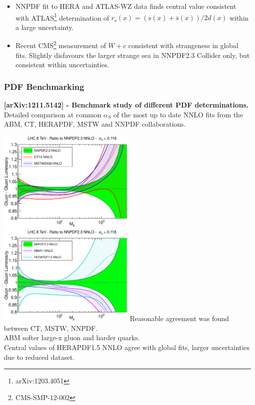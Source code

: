 \documentclass[10pt]{beamer}
\begin{document}
\begin{frame}
\begin{columns}
\begin{column}{0.5\textwidth}
   \end{column}
  \end{columns}
            \vskip10pt
  {\small
  \begin{itemize}
\item<1->NNPDF fit to HERA and ATLAS-WZ data finds central
value consistent with ATLAS\footnote{arXiv:1203.4051} determination of $r_s(x) = (s(x) + \bar{s}(x)) / 2d(x)$ within a large uncertainty.
\item<1->Recent CMS\footnote{CMS-SMP-12-002} measurement of $W+c$ consistent with strangeness in global fits.
Slightly disfavours the larger strange sea in NNPDF2.3 Collider only, but consistent within uncertainties.
\end{itemize}

}


\end{frame}


\begin{frame}
\frametitle{PDF Benchmarking}
\textbf{[arXiv:1211.5142] -
Benchmark study of different PDF determinations.}\\
\small{Detailed comparison at common $\alpha_S$ of the most up to date NNLO fits from the ABM, CT, HERAPDF, MSTW and NNPDF collaborations.}

\vskip10pt
     \includegraphics[width=0.5\textwidth]{gg_8tev_as_0118.eps}
 \includegraphics[width=0.5\textwidth]{gg_8tev_as_0118_b.eps}
\vskip10pt
\small{
Reasonable agreement was found between CT, MSTW, NNPDF. \\ \vskip5pt ABM softer large-x gluon and harder quarks.}
\\ \vskip5pt Central values of HERAPDF1.5 NNLO agree with
global fits,  larger uncertainties due to reduced dataset.

\end{frame}
\end{document}
